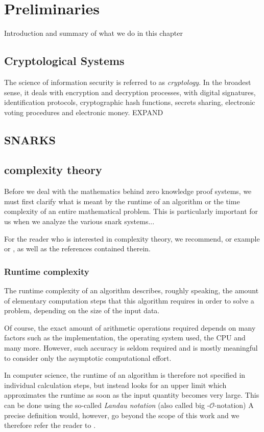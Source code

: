 \chapter{Preliminaries}

Introduction and summary of what we do in this chapter

\section{Cryptological Systems}
The science of information security is referred to as \textit{cryptology}. In the broadest sense, it deals with encryption and decryption processes, with digital signatures, identification protocols, cryptographic hash functions, secrets sharing, electronic voting procedures and electronic money. EXPAND

\section{SNARKS}



\section{complexity theory}
Before we deal with the mathematics behind zero knowledge proof systems, we must first clarify what is meant by the runtime of an algorithm or the time complexity of an entire mathematical problem. This is particularly important for us when we analyze the various snark systems...

For the reader who is interested in complexity theory, we recommend, or example 
or 
, as well as the references contained therein.

\subsection{Runtime complexity}
The runtime complexity of an algorithm describes, roughly speaking, the amount of elementary computation steps that this algorithm requires in order to solve a problem, depending on the size of the input data.

Of course, the exact amount of arithmetic operations required depends on many factors such as the implementation, the operating system used, the CPU and many more. However, such accuracy is seldom required and is mostly meaningful to consider only the asymptotic computational effort.

In computer science, the runtime of an algorithm is therefore not specified in individual calculation steps, but instead looks for an upper limit which approximates the runtime as soon as the input quantity becomes very large. This can be done using the so-called \textit{Landau notation} (also called big -$\mathcal{O}$-notation) A precise definition
would, however, go beyond the scope of this work and we therefore refer the reader to 
.

